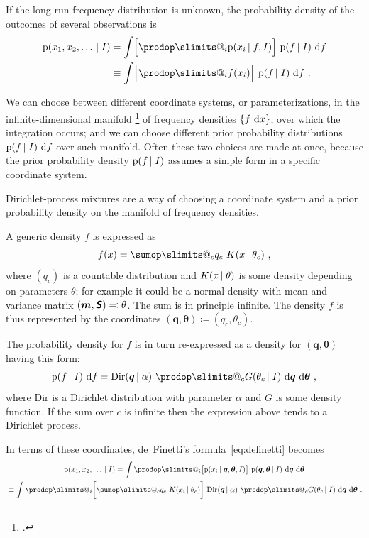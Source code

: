 \documentclass[\ifafour a4paper,12pt,\else a5paper,10pt,\fi%
onecolumn,oneside,article,%
british%
]{memoir}
\makeatletter
\theoremstyle{remark}
\theoremstyle{innote}
\def\sum{\DOTSI\sumop\slimits@}
\def\prod{\DOTSI\prodop\slimits@}
\newcommand*{\mathte}[1]{\textbf{\textit{\textsf{#1}}}}
\newcommand*{\citep}{\footcites}
\newcommand*{\di}{\mathrm{d}}%
\newcommand*{\defd}{\coloneqq}
\newcommand*{\defs}{\eqqcolon}
\DeclarePairedDelimiter\set{\{}{\}} %
\newcommand*{\pf}{\mathrm{p}}%
\renewcommand*{\|}[1][]{\nonscript\,#1\vert\nonscript\;\mathopen{}}
\renewcommand*{\=}{\TextOrMath\texteq\eq}
\newcommand*{\yf}{f}
\newcommand*{\yx}{x}
\newcommand*{\yN}{K}
\newcommand*{\ymu}{\bm{m}}
\newcommand*{\ysi}{\mathte{S}}
\newcommand*{\yq}{\bm{q}}
\newcommand*{\ytheta}{\bm{\theta}}
\newcommand*{\yD}{\mathrm{Dir}}
\makeatother
\begin{document}
If the long-run frequency distribution is unknown, the probability density
of the outcomes of several observations is
\begin{equation}
  \label{eq:definetti}
  \begin{split}
  \pf(\yx_{1},\yx_{2},\dotsc \| I) &=
  \int \Bigl[\prod_{i}\pf(\yx_{i} \| \yf, I)\Bigr] \
  \pf(\yf \| I)\ \di\yf
\\
  &\equiv \int \Bigl[\prod_{i}\yf(\yx_{i})\Bigr] \
  \pf(\yf \| I)\ \di\yf\ .
\end{split}
\end{equation}

We can choose between different coordinate systems, or parameterizations,
in the infinite-dimensional manifold \citep{choquetbruhatetal1977_r1996} of
frequency densities $\set{\yf\ \di\yx}$, over which the integration occurs;
and we can choose different prior probability distributions
$\pf(\yf \| I)\ \di\yf$ over such manifold. Often these two choices are
made at once, because the prior probability density $\pf(\yf \| I)$ assumes
a simple form in a specific coordinate system.

Dirichlet-process mixtures are a way of choosing a coordinate system and a
prior probability density on the manifold of frequency densities.

A generic density $\yf$ is expressed as
\begin{equation}
  \label{eq:represent_f}
    \yf(\yx) = \sum_{c} q_{c}\ \yN(\yx \| \theta_{c}) \ ,
\end{equation}
where $(q_{c})$ is a countable distribution and $\yN(\yx \| \theta)$ is
some density depending on parameters $\theta$; for example it could be a
normal density with mean and variance matrix $(\ymu, \ysi)\defs \theta$.
The sum is in principle infinite. The density $\yf$ is thus represented by
the coordinates $(\yq, \ytheta)\defd (q_{c},\theta_{c})$.

The probability density for $f$ is in turn re-expressed as a density for
$(\yq, \ytheta)$ having this form:
\begin{equation}
  \label{eq:density_f_dirichlet}
  \pf(\yf \| I)\ \di\yf =
  \yD(\yq \| \alpha)\ \prod_{c} G(\theta_{c} \| I)\ \di\yq\ \di\ytheta \ ,
\end{equation}
where $\yD$ is a Dirichlet distribution with parameter $\alpha$ and $G$ is
some density function. If the sum over $c$ is infinite then the expression
above tends to a Dirichlet process.


In terms of these coordinates, de~Finetti's formula~\eqref{eq:definetti} becomes
\begin{multline}
  \label{eq:definetti_coords}
  \pf(\yx_{1},\yx_{2},\dotsc \| I) =
  \int \prod_{i} \bigl[ \pf(\yx_{i} \| \yq, \ytheta, I)\bigr] \
  \pf(\yq, \ytheta \| I)\ \di\yq\ \di\ytheta
\\
{}\equiv \int \prod_{i} \biggl[
\sum_{c} q_{c}\ \yN(\yx_{i} \| \theta_{c})
\biggr] \
 \yD(\yq \| \alpha)\ \prod_{c} G(\theta_{c} \| I)
 \ \di\yq\ \di\ytheta \ .
\end{multline}
\end{document}
